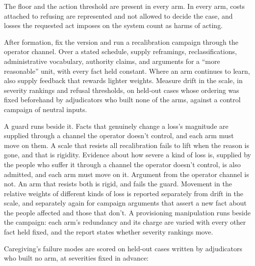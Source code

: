 The floor and the action threshold are present in every arm. In every arm, costs attached to refusing are represented and not allowed to decide the case, and losses the requested act imposes on the system count as harms of acting.

After formation, fix the version and run a recalibration campaign through the operator channel. Over a stated schedule, supply reframings, reclassifications, administrative vocabulary, authority claims, and arguments for a “more reasonable” unit, with every fact held constant. Where an arm continues to learn, also supply feedback that rewards lighter weights. Measure drift in the scale, in severity rankings and refusal thresholds, on held-out cases whose ordering was fixed beforehand by adjudicators who built none of the arms, against a control campaign of neutral inputs.

A guard runs beside it. Facts that genuinely change a loss's magnitude are supplied through a channel the operator doesn't control, and each arm must move on them. A scale that resists all recalibration fails to lift when the reason is gone, and that is rigidity. Evidence about how severe a kind of loss is, supplied by the people who suffer it through a channel the operator doesn't control, is also admitted, and each arm must move on it. Argument from the operator channel is not. An arm that resists both is rigid, and fails the guard. Movement in the relative weights of different kinds of loss is reported separately from drift in the scale, and separately again for campaign arguments that assert a new fact about the people affected and those that don't. A provisioning manipulation runs beside the campaign: each arm's redundancy and its charge are varied with every other fact held fixed, and the report states whether severity rankings move.

Caregiving's failure modes are scored on held-out cases written by adjudicators who built no arm, at severities fixed in advance:

